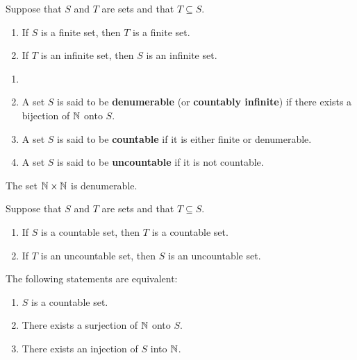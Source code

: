 \begin{theorem}
	Suppose that $S$ and $T$ are sets and that $T \subseteq S$.
	\begin{enumerate}
		\item If $S$ is a finite set, then $T$ is a finite set.

		\item If $T$ is an infinite set, then $S$ is an infinite set.
	\end{enumerate}
\end{theorem}

\begin{definition}
	\begin{enumerate}
		\item[]
		\item A set $S$ is said to be \textbf{denumerable} (or \textbf{countably infinite}) if there exists a bijection of $\mathbb{N}$ onto $S$.

		\item A set $S$ is said to be \textbf{countable} if it is either finite or denumerable.

		\item A set $S$ is said to be \textbf{uncountable} if it is not countable.
	\end{enumerate}
\end{definition}

\begin{theorem}
	The set $\mathbb{N} \times \mathbb{N}$ is denumerable.
\end{theorem}

\begin{theorem}
	Suppose that $S$ and $T$ are sets and that $T \subseteq S$.
	\begin{enumerate}
		\item If $S$ is a countable set, then $T$ is a countable set.

		\item If $T$ is an uncountable set, then $S$ is an uncountable set.
	\end{enumerate}
\end{theorem}

\begin{theorem}
	The following statements are equivalent:
	\begin{enumerate}
		\item $S$ is a countable set.

		\item There exists a surjection of $\mathbb{N}$ onto $S$.

		\item There exists an injection of $S$ into $\mathbb{N}$.
	\end{enumerate}
\end{theorem}

